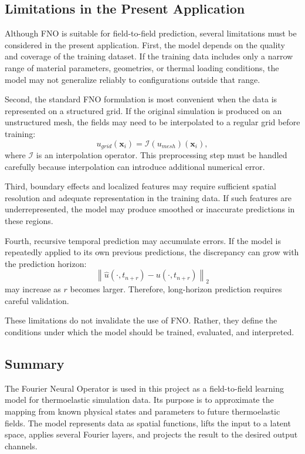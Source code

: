 \documentclass[14pt]{extarticle}
\begin{document}
\subsection{Limitations in the Present Application}

Although FNO is suitable for field-to-field prediction, several limitations must be considered in the present application. First, the model depends on the quality and coverage of the training dataset. If the training data includes only a narrow range of material parameters, geometries, or thermal loading conditions, the model may not generalize reliably to configurations outside that range.

Second, the standard FNO formulation is most convenient when the data is represented on a structured grid. If the original simulation is produced on an unstructured mesh, the fields may need to be interpolated to a regular grid before training:
\[
u_{grid}(\mathbf{x}_i)
=
\mathcal{I}
\left(
u_{mesh}
\right)(\mathbf{x}_i),
\]
where \(\mathcal{I}\) is an interpolation operator. This preprocessing step must be handled carefully because interpolation can introduce additional numerical error.

Third, boundary effects and localized features may require sufficient spatial resolution and adequate representation in the training data. If such features are underrepresented, the model may produce smoothed or inaccurate predictions in these regions.

Fourth, recursive temporal prediction may accumulate errors. If the model is repeatedly applied to its own previous predictions, the discrepancy can grow with the prediction horizon:
\[
\left\|
\hat{u}(\cdot, t_{n+r})
-
u(\cdot, t_{n+r})
\right\|_2
\]
may increase as \(r\) becomes larger. Therefore, long-horizon prediction requires careful validation.

These limitations do not invalidate the use of FNO. Rather, they define the conditions under which the model should be trained, evaluated, and interpreted.

\subsection{Summary}

The Fourier Neural Operator is used in this project as a field-to-field learning model for thermoelastic simulation data. Its purpose is to approximate the mapping from known physical states and parameters to future thermoelastic fields. The model represents data as spatial functions, lifts the input to a latent space, applies several Fourier layers, and projects the result to the desired output channels.
\end{document}
